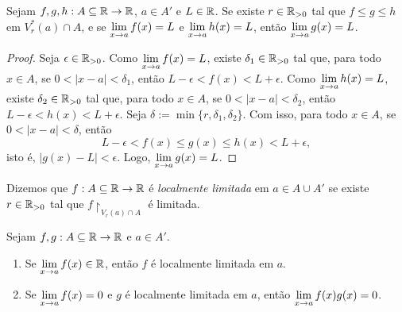 \begin{theorem}[Confronto]
    Sejam $f,g,h : A \subseteq \mathbb{R} \to \mathbb{R}$, $a \in A'$ e $L \in \mathbb{R}$. Se existe $r \in \mathbb{R}_{>0}$ tal que $f \leq g \leq h$ em $V^*_r(a) \cap A$, e se $\displaystyle \lim_{x \to a} f(x) = L$ e $\displaystyle \lim_{x \to a} h(x) = L$, então $\displaystyle \lim_{x \to a} g(x) = L$.
\end{theorem}

\begin{proof}
    Seja $\epsilon \in \mathbb{R}_{>0}$. Como $\displaystyle \lim_{x \to a} f(x) = L$, existe $\delta_1 \in \mathbb{R}_{>0}$ tal que, para todo $x \in A$, se $0<|x-a|<\delta_1$, então $L-\epsilon < f(x) < L+\epsilon$. Como $\displaystyle \lim_{x \to a} h(x) = L$, existe $\delta_2 \in \mathbb{R}_{>0}$ tal que, para todo $x \in A$, se $0<|x-a|<\delta_2$, então $L-\epsilon < h(x) < L+\epsilon$. Seja $\delta := \min \{r, \delta_1, \delta_2 \}$. Com isso, para todo $x \in A$, se $0<|x-a|<\delta$, então 
        \[
            L-\epsilon < f(x) \leq g(x) \leq h(x) < L+\epsilon,
        \]
    isto é, $|g(x) - L| < \epsilon$. Logo, $\displaystyle \lim_{x \to a} g(x) = L$. \blackproof
\end{proof}

\begin{definition}
    Dizemos que $f : A \subseteq \mathbb{R} \to \mathbb{R}$ é \emph{localmente limitada} em $a \in A \cup A'$ se existe $r \in \mathbb{R}_{>0}$ tal que $f \restriction_{V_r(a) \cap A}$ é limitada.
\end{definition}

\begin{proposition}
    Sejam $f,g : A \subseteq \mathbb{R} \to \mathbb{R}$ e $a \in A'$.
        \begin{enumerate}[leftmargin=*, align=left, label=\textbf{(\alph*)}]
            \item Se $\displaystyle \lim_{x \to a} f(x) \in \mathbb{R}$, então $f$ é localmente limitada em $a$.
            \item Se $\displaystyle \lim_{x \to a} f(x) = 0$ e $g$ é localmente limitada em $a$, então $\displaystyle \lim_{x \to a} f(x)g(x) = 0$.
        \end{enumerate}
\end{proposition}

